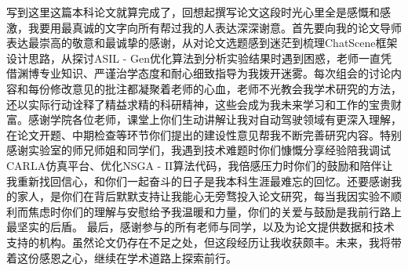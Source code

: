 \begin{acknowledgements} 
	
	写到这里这篇本科论文就算完成了，回想起撰写论文这段时光心里全是感慨和感激，我要用最真诚的文字向所有帮过我的人表达深深谢意。首先要向我的论文导师表达最崇高的敬意和最诚挚的感谢，从对论文选题感到迷茫到梳理ChatScene框架设计思路，从探讨ASIL - Gen优化算法到分析实验结果时遇到困惑，老师一直凭借渊博专业知识、严谨治学态度和耐心细致指导为我拨开迷雾。每次组会的讨论内容和每份修改意见的批注都凝聚着老师的心血，老师不光教会我学术研究的方法，还以实际行动诠释了精益求精的科研精神，这些会成为我未来学习和工作的宝贵财富。感谢学院各位老师，课堂上你们生动讲解让我对自动驾驶领域有更深入理解，在论文开题、中期检查等环节你们提出的建设性意见帮我不断完善研究内容。特别感谢实验室的师兄师姐和同学们，我遇到技术难题时你们慷慨分享经验陪我调试CARLA仿真平台、优化NSGA - II算法代码，我倍感压力时你们的鼓励和陪伴让我重新找回信心，和你们一起奋斗的日子是我本科生涯最难忘的回忆。还要感谢我的家人，是你们在背后默默支持让我能心无旁骛投入论文研究，每当我因实验不顺利而焦虑时你们的理解与安慰给予我温暖和力量，你们的关爱与鼓励是我前行路上最坚实的后盾。
	最后，感谢参与的所有老师与同学，以及为论文提供数据和技术支持的机构。虽然论文仍存在不足之处，但这段经历让我收获颇丰。未来，我将带着这份感恩之心，继续在学术道路上探索前行。
	
\end{acknowledgements}
